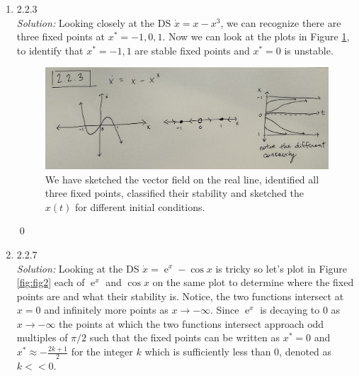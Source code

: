 \documentclass[10pt]{amsart}
\DeclareMathOperator{\E}{e}
\theoremstyle{nonumberplain}
\begin{document}
\begin{enumerate}[label={\bf {\arabic*}:}]
\item 2.2.3 \\
\textit{Solution:}
Looking closely at the DS $\dot x = x - x^3$, we can recognize there are three fixed points at $x^* = -1, 0, 1$.
Now we can look at the plots in Figure \ref{fig:f1}, to identify that $x^* = -1, 1$ are stable fixed points and $x^* = 0$ is unstable.
\begin{figure}[h]
	\centering
	\includegraphics[width=1\textwidth]{2_2_3.png}
 	\caption{We have sketched the vector field on the real line, identified all three fixed points, classified their stability and sketched the $x(t)$ for different initial conditions.}\label{fig:f1}
\end{figure}

\qed \\

\newpage

\item 2.2.7 \\
\textit{Solution:} Looking at the DS $\dot x = \E^x - \cos x$ is tricky so let's plot in Figure \ref{fig:fig2} each of $\E^x$ and $\cos x$ on the same plot to determine where the fixed points are and what their stability is.
Notice, the two functions intersect at $x = 0$ and infinitely more points as $x \rightarrow - \infty$.
Since $\E^x$ is decaying to 0 as $x \rightarrow - \infty$ the points at which the two functions intersect approach odd multiples of $\pi/2$ such that the fixed points can be written as $x^* = 0$ and $x^* \approx - \frac {2k + 1}{2}$ for the integer $k$ which is sufficiently less than 0, denoted as $k << 0$. \\


\end{enumerate}
\end{document}
